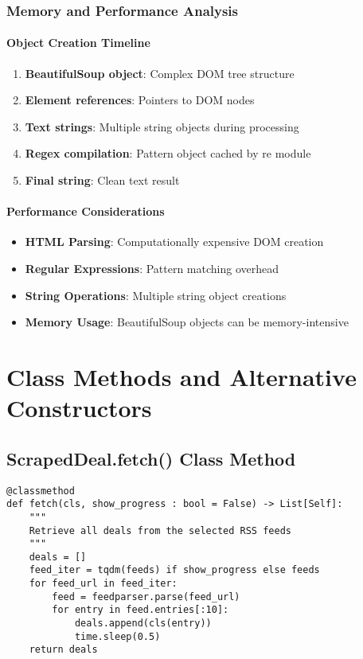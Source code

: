 \subsubsection{Memory and Performance Analysis}

\paragraph{Object Creation Timeline}
\begin{enumerate}
\item \textbf{BeautifulSoup object}: Complex DOM tree structure
\item \textbf{Element references}: Pointers to DOM nodes
\item \textbf{Text strings}: Multiple string objects during processing
\item \textbf{Regex compilation}: Pattern object cached by re module
\item \textbf{Final string}: Clean text result
\end{enumerate}

\paragraph{Performance Considerations}
\begin{itemize}
\item \textbf{HTML Parsing}: Computationally expensive DOM creation
\item \textbf{Regular Expressions}: Pattern matching overhead
\item \textbf{String Operations}: Multiple string object creations
\item \textbf{Memory Usage}: BeautifulSoup objects can be memory-intensive
\end{itemize}

\section{Class Methods and Alternative Constructors}

\subsection{ScrapedDeal.fetch() Class Method}

\begin{lstlisting}[caption=ScrapedDeal.fetch() Deep Analysis]
@classmethod
def fetch(cls, show_progress : bool = False) -> List[Self]:
    """
    Retrieve all deals from the selected RSS feeds
    """
    deals = []
    feed_iter = tqdm(feeds) if show_progress else feeds
    for feed_url in feed_iter:
        feed = feedparser.parse(feed_url)
        for entry in feed.entries[:10]:
            deals.append(cls(entry))
            time.sleep(0.5)
    return deals
\end{lstlisting}

